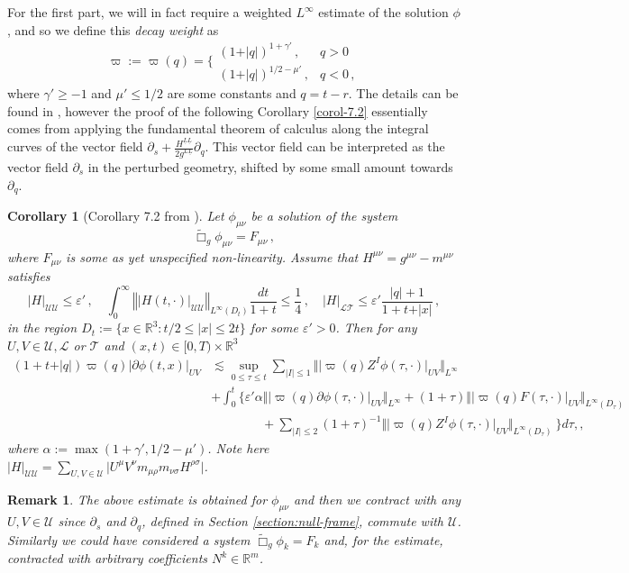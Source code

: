 \documentclass[11pt, a4paper]{amsart}
\numberwithin{equation}{section}
\newtheorem{remark}[theorem]{Remark}
\newtheorem{corollary}[theorem]{Corollary}
\numberwithin{theorem}{section}
\newcommand{\R}{\mathbb{R}}
\newcommand{\p}{\partial}
\newcommand{\mn}{{\mu \nu}}
\newcommand{\lbar}{\underline{L}}
\newcommand{\tbox}{\widetilde{\Box}}
\newcommand{\UU}{{\mathcal{U} \mathcal{U}}}
\newcommand{\LT}{{\mathcal{L} \mathcal{T}}}
\newcommand{\qv}{\vert q \vert}
\begin{document}
For the first part, we will in fact require a weighted $L^\infty$ estimate of the solution $\phi$, and so we define this \textit{decay weight} as
\begin{equation} \varpi := \varpi(q) = \Bigg\lbrace \begin{array}{ll}
(1+\qv)^{1+\gamma'} \,, & q>0 \\
(1+\qv)^{1/2-\mu'} \,, & q<0 \,,
\end{array} \label{eq:def-varpi} \end{equation}
where $ \gamma ' \geq -1$ and $\mu' \leq 1/2$ are some constants and $q=t-r$. The details can be found in \cite{LR:04}, however the proof of the following Corollary \eqref{corol-7.2} essentially comes from applying the fundamental theorem of calculus along the integral curves of the vector field $\p_s + \frac{H^{\lbar \lbar} }{2g^{L \lbar}} \p_q$. This vector field can be interpreted as the  vector field $\p_s$ in the perturbed geometry, shifted by some small amount towards $\p_q$. 

\begin{corollary}[Corollary 7.2 from \cite{LR:04}] \label{corol-7.2}
Let $\phi_\mn$ be a solution of the system
$$ \tbox_g \phi_\mn = F_\mn \,,$$
where $F_\mn$ is some as yet unspecified non-linearity. 
Assume that $H^\mn = g^\mn - m^\mn$ satisfies
\begin{equation}
\vert H \vert_\UU \leq \varepsilon' \,, \quad \int_0^\infty \left\Vert \vert H (t,\cdot) \vert_\UU \right\Vert_{L^\infty (D_t)} \frac{dt}{1+t} \leq \frac{1}{4} \,, \quad \vert H \vert_\LT \leq \varepsilon' \frac{\qv +1}{1+t+\vert x \vert} \,,
\end{equation}
in the region $D_t := \{ x \in \R^3 : t/2 \leq \vert x \vert \leq 2t \}$ for some $\varepsilon'>0$.  
Then for any $U, V \in \mathcal{U}, \mathcal{L}$ or $ \mathcal{T}$ and $(x,t) \in [0, T) \times \R^3$
\begin{align*}
(1+t+ \qv) \varpi (q) \vert \p \phi (t,x) \vert_{UV} & \lesssim \sup_{0 \leq \tau \leq t} \sum_{ \vert I \vert \leq 1} \Vert \vert \varpi (q) Z^I \phi (\tau, \cdot) \vert_{UV} \Vert_{L^\infty} \\
& +  \int_0^t \Big\lbrace \varepsilon' \alpha \Vert \vert \varpi (q) \p \phi (\tau, \cdot) \vert_{UV} \Vert_{L^\infty} + (1+\tau) \Vert \vert \varpi (q) F(\tau, \cdot) \vert_{UV} \Vert_{L^\infty(D_\tau)} \\
& \qquad  \qquad+ \sum_{\vert I \vert \leq 2} (1+\tau)^{-1} \Vert \vert \varpi (q) Z^I \phi (\tau, \cdot) \vert_{UV} \Vert_{L^\infty(D_\tau)} \ \Big\rbrace d\tau ,,
\end{align*}
where $\alpha := \max(1+\gamma', 1/2 - \mu')$. Note here $\vert H \vert_\UU = \sum_{U, V \in \mathcal{U}} \vert U^\mu V^\nu m_{\mu \rho} m_{\nu \sigma} H^{\rho \sigma} \vert$.
\end{corollary}
\begin{remark}
The above estimate is obtained for $\phi_\mn$ and then we contract with any $U, V \in \mathcal{U}$ since $\p_s$ and $\p_q$, defined in Section \ref{section:null-frame}, commute with $\mathcal{U}$. Similarly we could have considered a system $\tbox_g \phi_k = F_k$ and, for the estimate, contracted with arbitrary coefficients $N^k \in \R^m$. 
\end{remark}
\end{document}
